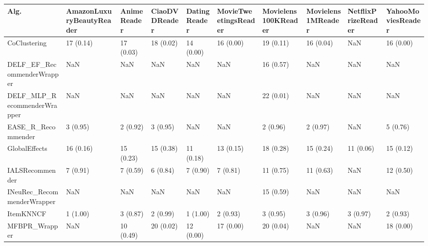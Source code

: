 \begin{tabular}{llllllllll}
\toprule
                               Alg. & AmazonLuxuryBeautyReader & AnimeReader & CiaoDVDReader & DatingReader & MovieTweetingsReader & Movielens100KReader & Movielens1MReader & NetflixPrizeReader & YahooMoviesReader \\
\midrule
                       CoClustering &                17 (0.14) &   17 (0.03) &     18 (0.02) &    14 (0.00) &            16 (0.00) &           19 (0.11) &         16 (0.04) &                NaN &         16 (0.00) \\
         DELF\_EF\_RecommenderWrapper &                      NaN &         NaN &           NaN &          NaN &                  NaN &           16 (0.57) &               NaN &                NaN &               NaN \\
        DELF\_MLP\_RecommenderWrapper &                      NaN &         NaN &           NaN &          NaN &                  NaN &           22 (0.01) &               NaN &                NaN &               NaN \\
                 EASE\_R\_Recommender &                 3 (0.95) &    2 (0.92) &      3 (0.95) &          NaN &                  NaN &            2 (0.96) &          2 (0.97) &                NaN &          5 (0.76) \\
                      GlobalEffects &                16 (0.16) &   15 (0.23) &     15 (0.38) &    11 (0.18) &            13 (0.15) &           18 (0.28) &         15 (0.24) &          11 (0.06) &         15 (0.12) \\
                    IALSRecommender &                 7 (0.91) &    7 (0.59) &      6 (0.84) &     7 (0.90) &             7 (0.81) &           11 (0.75) &         11 (0.63) &                NaN &         12 (0.50) \\
         INeuRec\_RecommenderWrapper &                      NaN &         NaN &           NaN &          NaN &                  NaN &           15 (0.59) &               NaN &                NaN &               NaN \\
                          ItemKNNCF &                 1 (1.00) &    3 (0.87) &      2 (0.99) &     1 (1.00) &             2 (0.93) &            3 (0.95) &          3 (0.96) &           3 (0.97) &          2 (0.93) \\
                      MFBPR\_Wrapper &                      NaN &   10 (0.49) &     20 (0.02) &    12 (0.00) &            17 (0.00) &           20 (0.04) &               NaN &                NaN &         18 (0.00) \\

\end{tabular}
